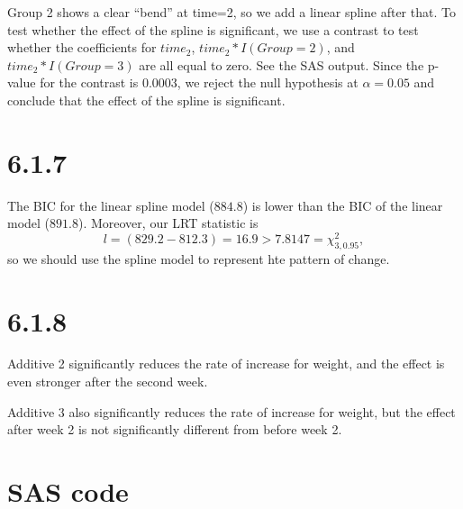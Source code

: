 \documentclass{article}[12pt]
\begin{document}
Group 2 shows a clear ``bend'' at time=2, so we add a linear spline after that.
To test whether the effect of the spline is significant,
we use a contrast to test whether the coefficients for $time_2$, $time_2*I(Group=2)$, and $time_2*I(Group=3)$ are all equal to zero.
See the SAS output.
Since the p-value for the contrast is $0.0003$,
we reject the null hypothesis at $\alpha=0.05$ and conclude that the effect of the spline is significant.

\section{6.1.7}
The BIC for the linear spline model ($884.8$) is lower than the BIC of the linear model ($891.8$).
Moreover, our LRT statistic is
\[
  l = (829.2 - 812.3) = 16.9  > 7.8147 = \chi^2_{3, 0.95},
\]
so we should use the spline model to represent hte pattern of change.

\section{6.1.8}

Additive 2 significantly reduces the rate of increase for weight,
and the effect is even stronger after the second week.

Additive 3 also significantly reduces the rate of increase for weight,
but the effect after week 2 is not significantly different from before week 2.

\pagebreak

\section{SAS code}
\end{document}
